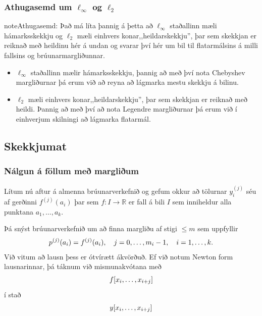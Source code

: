 \documentclass[a4paper,10pt,icelandic]{sphinxmanual}
\begin{document}
\subsubsection{Athugasemd um \(\ell_\infty\) og \(\ell_2\)}
\label{kafli03:athugasemd-um-og}
\begin{notice}{note}{Athugasemd:}
Það má líta þannig á þetta að \(\ell_\infty\) staðallinn
mæli hámarksskekkju
og \(\ell_2\) mæli einhvers konar,,heildarskekkju'',
þar sem skekkjan er reiknað með heildinu hér á undan og svarar því hér um
bil til flatarmálsins á milli fallsins og brúunarmargliðunnar.
\end{notice}
\begin{itemize}
\item {} 
\(\ell_\infty\) staðallinn mælir hámarksskekkju, þannig að með
því nota Chebyshev margliðurnar þá erum við að reyna að lágmarka mestu skekkju
á bilinu.

\item {} 
\(\ell_2\) mæli einhvers konar,,heildarskekkju'',
þar sem skekkjan er reiknað með heildi.
Þannig að með því að nota Legendre margliðurnar þá erum við
í einhverjum skilningi að lágmarka flatarmál.

\end{itemize}


\subsection{Skekkjumat}
\label{kafli03:skekkjumat}\label{kafli03:index-18}

\subsubsection{Nálgun á föllum með margliðum}
\label{kafli03:nalgun-a-follum-me-marglium}
Lítum nú aftur á almenna brúunarverkefnið og gefum okkur að tölurnar
\(y_i^{(j)}\) séu af gerðinni \(f^{(j)}(a_i)\) þar sem
\(f : I \to {{\mathbb  R}}\) er fall á bili \(I\) sem inniheldur
alla punktana \(a_1, \ldots, a_k\).

Þá snýst brúunarverkefnið um að finna margliðu af stigi \(\leq m\)
sem uppfyllir
\begin{gather}
\begin{split}p^{(j)}(a_i) = f^{(j)}(a_i), \quad
  j = 0, \ldots, m_i-1, \quad i = 1, \ldots, k.\end{split}\notag
\end{gather}
Við vitum að lausn þess er ótvírætt ákvörðuð. Ef við notum Newton form
lausnarinnar, þá táknum við mismunakvótana með
\begin{gather}
\begin{split}f[x_i,\ldots,x_{i+j}]\end{split}\notag
\end{gather}
í stað
\begin{gather}
\begin{split}y[x_i,\ldots,x_{i+j}]\end{split}\notag
\end{gather}
\end{document}
